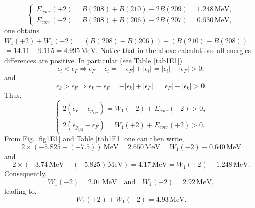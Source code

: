  \begin{equation*}
 \left\{
 \begin{array}{c}
  E_{corr}(+2)=B(208)+B(210)-2B(209)=1.248\,\text{MeV},\\ 
  E_{corr}(-2)=B(208)+B(206)-2B(207)=0.630\,\text{MeV},
 \end{array}
 \right.
 \end{equation*}
 one obtains
 $W_1(+2)+W_1(-2)=(B(208)-B(206))-(B(210)-B(208))$
 $=14.11-9.115=4.995 \,\text{MeV}$. Notice that in the above calculations all energies differences are positive. In particular (see Table \ref{tab1E1})  
\begin{equation*}
\epsilon_i<\epsilon_F\Rightarrow \epsilon_F-\epsilon_i=-|\epsilon_F|+|\epsilon_i|=|\epsilon_i|-|\epsilon_F|>0,
\end{equation*}
and
\begin{equation*}
\epsilon_k>\epsilon_F\Rightarrow \epsilon_k-\epsilon_F=-|\epsilon_k|+|\epsilon_F|=|\epsilon_F|-|\epsilon_k|>0.
\end{equation*}
Thus,
\begin{equation*}
\left\{
\begin{array}{c}
 2(\epsilon_F-\epsilon_{p_{1/2}})=W_1(-2)+E_{corr}(-2)>0,\\ 
 2(\epsilon_{g_{9/2}}-\epsilon_F)=W_1(+2)+E_{corr}(+2)>0.
\end{array}
\right.
\end{equation*}
From Fig. \ref{fig1E1} and Table \ref{tab1E1} one can then write,
\begin{equation*} 
2\times(-5.825-(-7.5))\,\text{MeV}=2.650\,\text{MeV}=W_1(-2)+0.640\,\text{MeV}
\end{equation*}
and 
\begin{equation*} 
2\times(-3.74\, \text{MeV}-(-5.825)\,\text{MeV})=4.17\, \text{MeV}=W_1(+2)+1.248\, \text{MeV}.
\end{equation*}
Consequently,
\begin{equation*} 
W_1(-2)=2.01\,\text{MeV}\quad \text{and} \quad W_1(+2)=2.92\,\text{MeV},
\end{equation*}
leading to,
\begin{equation*} 
W_1(+2)+W_1(-2)=4.93\,\text{MeV}.
\end{equation*}

